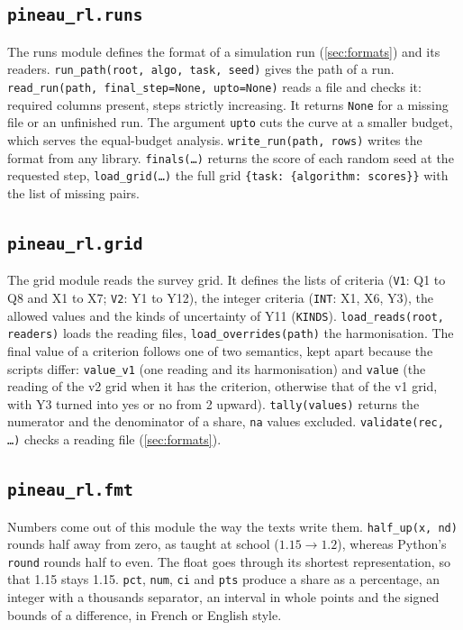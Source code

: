 \subsection{\texttt{pineau\_rl.runs}}

The runs module defines the format of a simulation run (\cref{sec:formats}) and its readers.
\texttt{run\_path(root, algo, task, seed)} gives the path of a run. \texttt{read\_run(path,
final\_step=None, upto=None)} reads a file and checks it: required columns present, steps strictly
increasing. It returns \texttt{None} for a missing file or an unfinished run. The argument
\texttt{upto} cuts the curve at a smaller budget, which serves the equal-budget analysis.
\texttt{write\_run(path, rows)} writes the format from any library. \texttt{finals(\dots)} returns the
score of each random seed at the requested step, \texttt{load\_grid(\dots)} the full grid
\texttt{\{task: \{algorithm: scores\}\}} with the list of missing pairs.

\subsection{\texttt{pineau\_rl.grid}}

The grid module reads the survey grid. It defines the lists of criteria (\texttt{V1}: Q1 to Q8 and X1 to
X7; \texttt{V2}: Y1 to Y12), the integer criteria (\texttt{INT}: X1, X6, Y3), the allowed values and
the kinds of uncertainty of Y11 (\texttt{KINDS}). \texttt{load\_reads(root, readers)} loads the
reading files, \texttt{load\_overrides(path)} the harmonisation. The final value of a criterion
follows one of two semantics, kept apart because the scripts differ: \texttt{value\_v1} (one reading
and its harmonisation) and \texttt{value} (the reading of the v2 grid when it has the criterion,
otherwise that of the v1 grid, with Y3 turned into yes or no from 2 upward). \texttt{tally(values)}
returns the numerator and the denominator of a share, \texttt{na} values excluded.
\texttt{validate(rec, \dots)} checks a reading file (\cref{sec:formats}).

\subsection{\texttt{pineau\_rl.fmt}}

Numbers come out of this module the way the texts write them. \texttt{half\_up(x, nd)} rounds half away
from zero, as taught at school ($1.15 \to 1.2$), whereas Python's \texttt{round} rounds half to
even. The float goes through its shortest representation, so that 1.15 stays 1.15. \texttt{pct},
\texttt{num}, \texttt{ci} and \texttt{pts} produce a share as a percentage, an integer with a
thousands separator, an interval in whole points and the signed bounds of a difference, in French or
English style.

